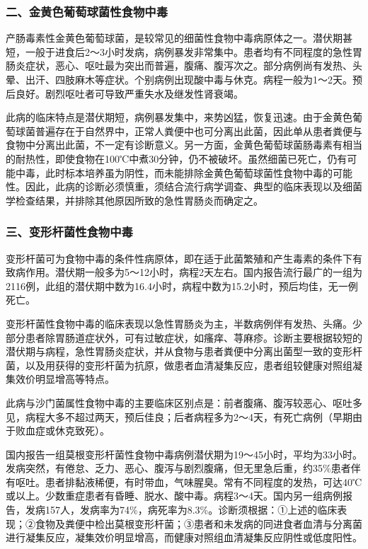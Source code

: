 \subsubsection{二、金黄色葡萄球菌性食物中毒}

产肠毒素性金黄色葡萄球菌，是较常见的细菌性食物中毒病原体之一。潜伏期甚短，一般于进食后2～3小时发病，病例暴发非常集中。患者均有不同程度的急性胃肠炎症状，恶心、呕吐最为突出而普遍，腹痛、腹泻次之。部分病例尚有发热、头晕、出汗、四肢麻木等症状。个别病例出现酸中毒与休克。病程一般为1～2天。预后良好。剧烈呕吐者可导致严重失水及继发性肾衰竭。

此病的临床特点是潜伏期短，病例暴发集中，来势凶猛，恢复迅速。由于金黄色葡萄球菌普遍存在于自然界中，正常人粪便中也可分离出此菌，因此单从患者粪便与食物中分离出此菌，不一定有诊断意义。另一方面，金黄色葡萄球菌肠毒素有相当的耐热性，即使食物在100℃中煮30分钟，仍不被破坏。虽然细菌已死亡，仍有可能中毒，此时标本培养虽为阴性，而未能排除金黄色葡萄球菌性食物中毒的可能性。因此，此病的诊断必须慎重，须结合流行病学调查、典型的临床表现以及细菌学检查结果，并排除其他原因所致的急性胃肠炎而确定之。

\subsubsection{三、变形杆菌性食物中毒}

变形杆菌可为食物中毒的条件性病原体，即在适于此菌繁殖和产生毒素的条件下有致病作用。潜伏期一般多为5～12小时，病程2天左右。国内报告流行最广的一组为2116例，此组的潜伏期中数为16.4小时，病程中数为15.2小时，预后均佳，无一例死亡。

变形杆菌性食物中毒的临床表现以急性胃肠炎为主，半数病例伴有发热、头痛。少部分患者除胃肠道症状外，可有过敏症状，如瘙痒、荨麻疹。诊断主要根据较短的潜伏期与病程，急性胃肠炎症状，并从食物与患者粪便中分离出菌型一致的变形杆菌，以及用获得的变形杆菌为抗原，做患者血清凝集反应，患者组较健康对照组凝集效价明显增高等特点。

此病与沙门菌属性食物中毒的主要临床区别点是：前者腹痛、腹泻较恶心、呕吐多见，病程大多不超过两天，预后佳良；后者病程多为2～4天，有死亡病例（早期由于败血症或休克致死）。

国内报告一组莫根变形杆菌性食物中毒病例潜伏期为19～45小时，平均为33小时。发病突然，有倦怠、乏力、恶心、腹泻与剧烈腹痛，但无里急后重，约35\%患者伴有呕吐。患者排黏液稀便，有时带血，气味腥臭。常有不同程度的发热，可达40℃或以上。少数重症患者有昏睡、脱水、酸中毒。病程3～4天。国内另一组病例报告，发病157人，发病率为74\%，病死率为8.3\%。诊断须根据：①上述的临床表现；②食物及粪便中检出莫根变形杆菌；③患者和未发病的同进食者血清与分离菌进行凝集反应，凝集效价明显增高，而健康对照组血清凝集反应阴性或低度阳性。

